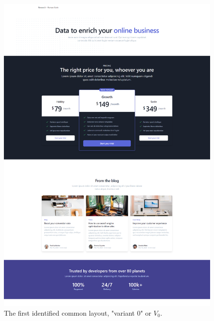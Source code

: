 \documentclass[conference]{IEEEtran}
\begin{document}
\begin{figure}[h]
\centering
\label{fig:variant0}
\includegraphics[width=\columnwidth]{media/8nqXhdl3JD8u.png}
\caption{The first identified common layout, "variant 0" or \(V_0\).}
\end{figure}
\end{document}
